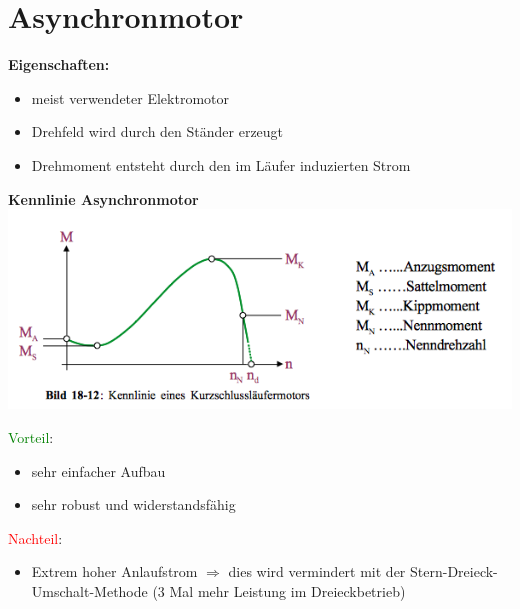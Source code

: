 \section{Asynchronmotor}
\renewcommand{\arraystretch}{0.9}  
\begin{minipage}{0.4\linewidth}
    \textbf{Eigenschaften:}
    \begin{itemize}
        \item meist verwendeter Elektromotor
        \item Drehfeld wird durch den Ständer erzeugt
        \item Drehmoment entsteht durch den im Läufer induzierten Strom
    \end{itemize}
\end{minipage} 
\begin{minipage}{0.5\linewidth}
    \textbf{Kennlinie Asynchronmotor}\newline
    \includegraphics[scale = 0.6]{images/KennlinieASM}
\end{minipage}
\begin{multicols}{2}     
    \begin{minipage}{\linewidth}
        \textcolor{green}{Vorteil}:
        \begin{itemize}
            \item sehr einfacher Aufbau
            \item sehr robust und widerstandsfähig 
        \end{itemize}
    \end{minipage}
    
    \begin{minipage}{\linewidth}
        \textcolor{red}{Nachteil}:
        \begin{itemize}
            \item Extrem hoher Anlaufstrom \newline
            $\Rightarrow$ dies wird vermindert mit der Stern-Dreieck-Umschalt-Methode \newline
            (3 Mal mehr Leistung im Dreieckbetrieb)
        \end{itemize}
    \end{minipage}
\end{multicols}

